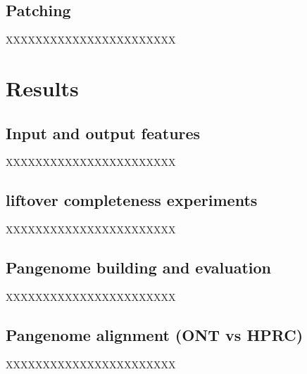 \documentclass{bioinfo}
\theoremstyle{definition}
\begin{document}
\subsection{Patching}
XXXXXXXXXXXXXXXXXXXXXXX

\section{Results}
\label{sec:results}

\subsection{Input and output features}
XXXXXXXXXXXXXXXXXXXXXXX

\subsection{liftover completeness experiments}
XXXXXXXXXXXXXXXXXXXXXXX

\subsection{Pangenome building and evaluation}
XXXXXXXXXXXXXXXXXXXXXXX

\subsection{Pangenome alignment (ONT vs HPRC)}
XXXXXXXXXXXXXXXXXXXXXXX
\end{document}
